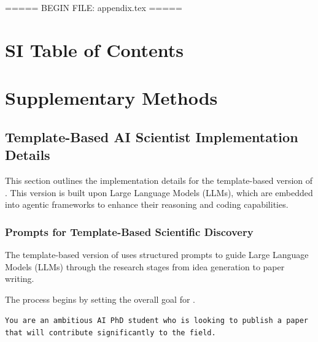 ===== BEGIN FILE: appendix.tex =====




\setcounter{page}{1}





\begin{appendices}

\vspace*{5pt}

\section*{SI Table of Contents}
\vspace*{-5pt}
\startcontents[sections]

\clearpage

\section{Supplementary Methods}
\label{app:sup_methods}

\subsection{Template-Based AI Scientist Implementation Details}
\label{app:v1_details}

This section outlines the implementation details for the template-based version of \ouralgo. This version is built upon Large Language Models (LLMs), which are embedded into agentic frameworks to enhance their reasoning and coding capabilities.

\subsubsection{Prompts for Template-Based Scientific Discovery}
\label{app:v1_prompts_scientist}
The template-based version of \ouralgo uses structured prompts to guide Large Language Models (LLMs) through the research stages from idea generation to paper writing.

The process begins by setting the overall goal for \ouralgo.
\begin{tcolorbox}[breakable,colback=orange!5!white, colframe=orange!80!black, title=Idea Generation System Prompt]
\texttt{You are an ambitious AI PhD student who is looking to publish a paper that will contribute significantly to the field.}
\end{tcolorbox}


\end{appendices}
